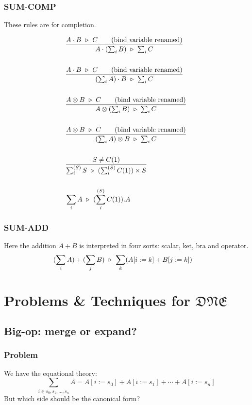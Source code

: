 \subsubsection*{\textsf{SUM-COMP}}
These rules are for completion.

\begin{align*}
  & \frac{A \cdot B \ \triangleright\  C \qquad \text{(bind variable renamed)}}{A \cdot (\sum_i B) \ \triangleright\  \sum_i C} \\
  \\
  & \frac{A \cdot B \ \triangleright\  C \qquad \text{(bind variable renamed)}}{(\sum_i A) \cdot B \ \triangleright\  \sum_i C} \\
  \\
  & \frac{A \otimes B \ \triangleright\  C \qquad \text{(bind variable renamed)}}{A \otimes (\sum_i B) \ \triangleright\  \sum_i C} \\
  \\
  & \frac{A \otimes B \ \triangleright\  C \qquad \text{(bind variable renamed)}}{(\sum_i A) \otimes B \ \triangleright\  \sum_i C} \\
  \\
  & \frac{S \neq C(1)}{\sum_i^{(S)} S \ \triangleright\  (\sum^{(S)}_i C(1)) \times S} \\
  \\
  & \sum_i A \ \triangleright\  (\sum^{(S)}_i C(1)).A
\end{align*}

\subsubsection*{\textsf{SUM-ADD}}
Here the addition $A + B$ is interpreted in four sorts: scalar, ket, bra and operator.
\begin{align*}
  & (\sum_i A) + (\sum_j B) \ \triangleright\  \sum_k (A[i:=k] + B[j:=k])
\end{align*}

\section{Problems \& Techniques for $\mathfrak{DNE}$}

\subsection{Big-op: merge or expand?}

\subsubsection*{Problem}
We have the equational theory:
$$
\sum_{i\in{s_0, s_1, ..., s_n}} A = A[i:=s_0] + A[i:=s_1] + \cdots + A[i:=s_n]
$$
But which side should be the canonical form?


